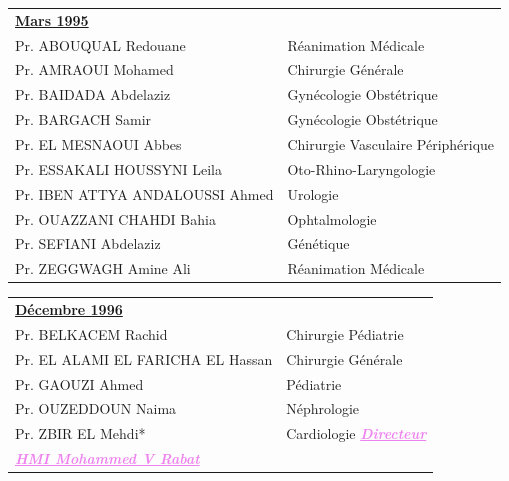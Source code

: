  \vspace*{1em}

\begin{tabular}{l l}
  \multicolumn{2}{l}{\textbf{\underline{Mars 1995}}}\vspace*{0.5em}\\
  Pr. ABOUQUAL Redouane	& Réanimation Médicale\\
  Pr. AMRAOUI Mohamed	& Chirurgie Générale\\
  Pr. BAIDADA Abdelaziz	&  Gynécologie Obstétrique\\
  Pr. BARGACH Samir	& Gynécologie Obstétrique\\
  Pr. EL MESNAOUI Abbes	& Chirurgie Vasculaire Périphérique\\
  Pr. ESSAKALI HOUSSYNI Leila	& Oto-Rhino-Laryngologie\\
  Pr. IBEN ATTYA ANDALOUSSI Ahmed	&  Urologie\\
  Pr. OUAZZANI CHAHDI Bahia	&  Ophtalmologie\\
  Pr. SEFIANI Abdelaziz	& Génétique\\
  Pr. ZEGGWAGH Amine Ali	& Réanimation Médicale\\
  
\end{tabular}

\begin{table}[H]

\begin{tabular}{l l}
 \multicolumn{2}{l}{\textbf{\underline{Décembre 1996}}}\vspace*{0.5em}\\
 Pr. BELKACEM Rachid & \hspace*{2em} Chirurgie	Pédiatrie \\
 Pr. EL ALAMI EL FARICHA EL Hassan & \hspace*{2em} Chirurgie Générale  \\
 Pr. GAOUZI Ahmed & \hspace*{2em} Pédiatrie \\
 Pr. OUZEDDOUN Naima	& \hspace*{2em} Néphrologie\\
 Pr. ZBIR EL Mehdi* &	\hspace*{2em} Cardiologie \textcolor{violet}{\textbf{\emph{\underline{Directeur}}}} \\
  \textcolor{violet}{\textbf{\emph{\underline{HMI Mohammed V Rabat}}}} & \\
\end{tabular}

\end{table}

